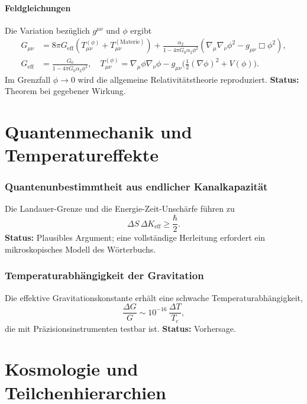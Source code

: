 \documentclass[11pt,a4paper]{article}
\begin{document}
	\subsection{Feldgleichungen}
	Die Variation bezüglich \(g^{\mu\nu}\) und \(\phi\) ergibt
	\begin{align}
		G_{\mu\nu} &= 8\pi G_{\mathrm{eff}}\left(T_{\mu\nu}^{(\phi)} + T_{\mu\nu}^{(\mathrm{Materie})}\right) + \frac{\alpha_2}{1-4\pi G_0\alpha_2\phi^2}\left(\nabla_\mu\nabla_\nu\phi^2 - g_{\mu\nu}\Box\phi^2\right), \label{eq:einstein-mod} \\
		G_{\mathrm{eff}} &= \frac{G_0}{1-4\pi G_0\alpha_2\phi^2},\quad
		T_{\mu\nu}^{(\phi)} = \nabla_\mu\phi\nabla_\nu\phi - g_{\mu\nu}\bigl(\tfrac12(\nabla\phi)^2 + V(\phi)\bigr).
	\end{align}
	Im Grenzfall \(\phi\to0\) wird die allgemeine Relativitätstheorie reproduziert. \textbf{Status:} Theorem bei gegebener Wirkung.
	
	\part{Quantenmechanik und Temperatureffekte}
	
	\section{Quantenunbestimmtheit aus endlicher Kanalkapazität}
	Die Landauer-Grenze und die Energie-Zeit-Unschärfe führen zu
	\[
	\Delta S \, \Delta K_{\mathrm{eff}} \ge \frac{\hbar}{2}.
	\]
	\textbf{Status:} Plausibles Argument; eine vollständige Herleitung erfordert ein mikroskopisches Modell des Wörterbuchs.
	
	\section{Temperaturabhängigkeit der Gravitation}
	\label{sec:temperature}
	Die effektive Gravitationskonstante erhält eine schwache Temperaturabhängigkeit,
	\[
	\frac{\Delta G}{G} \sim 10^{-16}\,\frac{\Delta T}{T_c},
	\]
	die mit Präzisionsinstrumenten testbar ist. \textbf{Status:} Vorhersage.
	
	\part{Kosmologie und Teilchenhierarchien}
	
\end{document}
